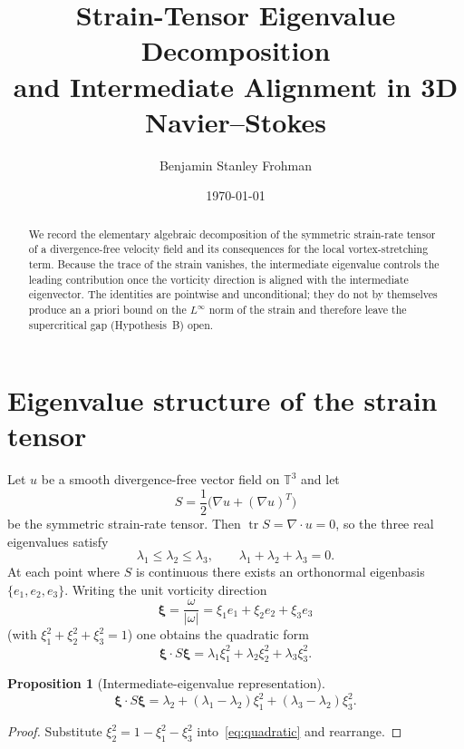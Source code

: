 \documentclass[11pt,a4paper]{article}
\title{Strain-Tensor Eigenvalue Decomposition\\and Intermediate Alignment in 3D Navier--Stokes}
\author{Benjamin Stanley Frohman}
\date{\today}
\newtheorem{proposition}[theorem]{Proposition}
\begin{document}
\maketitle

\begin{abstract}
We record the elementary algebraic decomposition of the symmetric strain-rate tensor of a divergence-free velocity field and its consequences for the local vortex-stretching term. Because the trace of the strain vanishes, the intermediate eigenvalue controls the leading contribution once the vorticity direction is aligned with the intermediate eigenvector. The identities are pointwise and unconditional; they do not by themselves produce an a priori bound on the \(L^\infty\) norm of the strain and therefore leave the supercritical gap (Hypothesis~B) open.
\end{abstract}

\section{Eigenvalue structure of the strain tensor}

Let \(u\) be a smooth divergence-free vector field on \(\mathbb{T}^3\) and let
\[
S=\frac12\bigl(\nabla u+(\nabla u)^T\bigr)
\]
be the symmetric strain-rate tensor. Then \(\operatorname{tr}S=\nabla\cdot u=0\), so the three real eigenvalues satisfy
\begin{equation}\label{eq:trace}
\lambda_1\le\lambda_2\le\lambda_3,\qquad\lambda_1+\lambda_2+\lambda_3=0.
\end{equation}
At each point where \(S\) is continuous there exists an orthonormal eigenbasis \(\{e_1,e_2,e_3\}\). Writing the unit vorticity direction
\[
\boldsymbol{\xi}=\frac{\omega}{|\omega|}=\xi_1 e_1+\xi_2 e_2+\xi_3 e_3
\]
(with \(\xi_1^2+\xi_2^2+\xi_3^2=1\)) one obtains the quadratic form
\begin{equation}\label{eq:quadratic}
\boldsymbol{\xi}\cdot S\boldsymbol{\xi}=\lambda_1\xi_1^2+\lambda_2\xi_2^2+\lambda_3\xi_3^2.
\end{equation}

\begin{proposition}[Intermediate-eigenvalue representation]
\[
\boldsymbol{\xi}\cdot S\boldsymbol{\xi}
=\lambda_2+(\lambda_1-\lambda_2)\xi_1^2+(\lambda_3-\lambda_2)\xi_3^2.
\]
\end{proposition}

\begin{proof}
Substitute \(\xi_2^2=1-\xi_1^2-\xi_3^2\) into~\eqref{eq:quadratic} and rearrange.
\end{proof}
\end{document}
